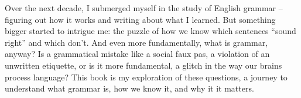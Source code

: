 Over the next decade, I submerged myself in the study of English grammar -- figuring out how it works and writing about what I learned. But something bigger started to intrigue me: the puzzle of how we know which sentences ``sound right'' and which don't. And even more fundamentally, what is grammar, anyway? Is a grammatical mistake like a social faux pas, a violation of an unwritten etiquette, or is it more fundamental, a glitch in the way our brains process language? This book is my exploration of these questions, a journey to understand what grammar is, how we know it, and why it it matters.